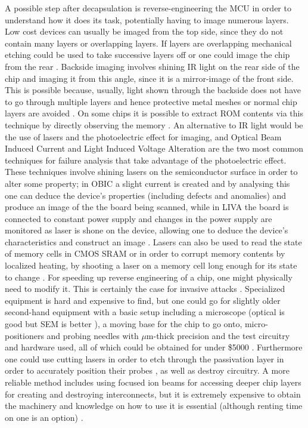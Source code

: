 A possible step after decapsulation is reverse-engineering the MCU in order to understand how it does its task, potentially having to image numerous layers. Low cost devices can usually be imaged from the top side, since they do not contain many layers or overlapping layers. If layers are overlapping mechanical etching could be used to take successive layers off \citep{ic_decap} \citep{hwre} or one could image the chip from the rear \citep{hwre} \citep{sergei:thesis}. Backside imaging involves shining IR light on the rear side of the chip and imaging it from this angle, since it is a mirror-image of the front side. This is possible because, usually, light shown through the backside does not have to go through multiple layers and hence protective metal meshes or normal chip layers are avoided \citep{hwre}. On some chips it is possible to extract ROM contents via this technique by directly observing the memory \citep{sergei:thesis}. An alternative to IR light would be the use of lasers and the photoelectric effect for imaging, and Optical Beam Induced Current and Light Induced Voltage Alteration are the two most common techniques for failure analysis that take advantage of the photoelectric effect. These techniques involve shining lasers on the semiconductor surface in order to alter some property; in OBIC a slight current is created and by analysing this one can deduce the device's properties (including defects and anomalies) and produce an image of the the board being scanned, while in LIVA the board is connected to constant power supply and changes in the power supply are monitored as laser is shone on the device, allowing one to deduce the device's characteristics and construct an image \citep{cole:OBIC}. Lasers can also be used to read the state of memory cells in CMOS SRAM \citep{sergei:thesis} or in order to corrupt memory contents by localized heating, by shooting a laser on a memory cell long enough for its state to change \citep{website:riscure} \citep{sergei:thesis}.
For speeding up reverse engineering of a chip, one might physically need to modify it. This is certainly the case for invasive attacks \citep{sergei:thesis} \citep{gutman:memory_remanence}. Specialized equipment is hard and expensive to find, but one could go for slightly older second-hand equipment with a basic setup including a microscope (optical is good but SEM is better \citep{sergei:thesis} \citep{hwre}), a moving base for the chip to go onto, micro-positioners and probing needles with $\mu$m-thick precision and the test circuitry and hardware used, all of which could be obtained for under \$5000 \citep{low_cost_probing} \citep{gutman:memory_remanence} \citep{sergei:thesis} \citep{hwre}. Furthermore one could use cutting lasers in order to etch through the passivation layer in order to accurately position their probes \citep{sergei:thesis}, as well as destroy circuitry. A more reliable method includes using focused ion beams for accessing deeper chip layers for creating and destroying interconnects, but it is extremely expensive to obtain the machinery and knowledge on how to use it is essential (although renting time on one is an option) \citep{sergei:thesis} \citep{hwre} \citep{gutman:memory_remanence}.
